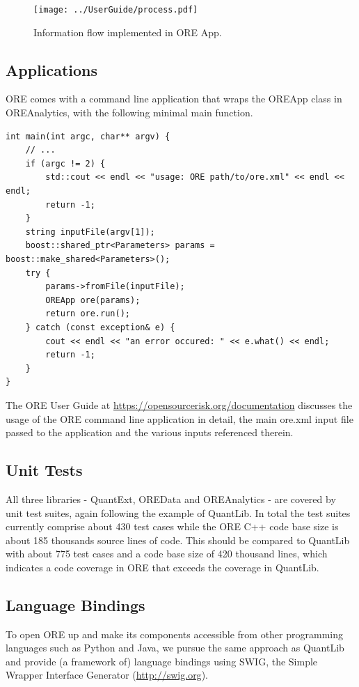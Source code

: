\documentclass[12pt, a4paper]{article}
\begin{document}
\begin{figure}[h]
\begin{center}
\texttt{[image: ../UserGuide/process.pdf]}
\end{center}
\caption{ Information flow implemented in ORE App. }
\label{fig_process}
\end{figure}


\subsection*{Applications}
ORE comes with a command line application that wraps the OREApp class in OREAnalytics, with the following minimal main function.

\begin{listing}[H]
\begin{verbatim}
int main(int argc, char** argv) {
	// ...
	if (argc != 2) {
		std::cout << endl << "usage: ORE path/to/ore.xml" << endl << endl;
		return -1;
	}
	string inputFile(argv[1]);
	boost::shared_ptr<Parameters> params = boost::make_shared<Parameters>();
	try {
		params->fromFile(inputFile);
		OREApp ore(params);
		return ore.run();
	} catch (const exception& e) {
		cout << endl << "an error occured: " << e.what() << endl;
		return -1;
	}
}
\end{verbatim}
\end{listing}

The ORE User Guide at \url{https://opensourcerisk.org/documentation} discusses the usage of the ORE command line application in detail, the main ore.xml input file passed to the application and the various inputs referenced therein.

\subsection*{Unit Tests}
All three libraries - QuantExt, OREData and OREAnalytics - are covered by unit test suites, again following the example of QuantLib. In total the test suites currently
comprise about 430 test cases while the ORE C++ code base size is about 185 thousands source lines of code. This should be compared to QuantLib with about 775 test cases and a code base size of 420 thousand lines, which indicates a code coverage
in ORE that exceeds the coverage in QuantLib.

\subsection*{Language Bindings}
To open ORE up and make its components accessible from other programming languages such as Python and Java, we pursue the same approach as QuantLib and provide (a framework of) language bindings using SWIG, the Simple Wrapper
Interface Generator (\url{http://swig.org}).
\end{document}
